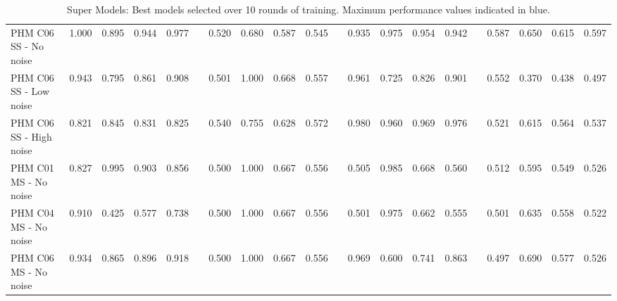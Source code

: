 \documentclass[a4paper, 12pt]{article}
\begin{document}
\begin{appendices}
\begin{landscape}
\begin{table}
\begin{tabular}{@{}l rrrr c rrrr c rrrr c rrrr@{}}
			PHM C06 SS - No noise &\textcolor{dblue}{1.000} &\textcolor{dblue}{0.895} &\textcolor{dblue}{0.944} & \textcolor{dblue}{0.977} & & 0.520 &0.680 &0.587 &0.545 & &0.935 &0.975 &0.954 &0.942 & &0.587 &0.650 &0.615&0.597\\
			PHM C06 SS - Low noise &\textcolor{dblue}{0.943} &0.795 &\textcolor{dblue}{0.861} & \textcolor{dblue}{0.908} & & 0.501 &\textcolor{dblue}{1.000} &0.668 &0.557 & &0.961 &0.725 &0.826 &0.901 & &0.552 &0.370 &0.438&0.497\\
			PHM C06 SS - High noise &0.821 &0.845 &0.831 & 0.825 & & 0.540 &0.755 &0.628 &0.572 & &\textcolor{dblue}{0.980} &\textcolor{dblue}{0.960}&\textcolor{dblue}{0.969} &\textcolor{dblue}{0.976} & &0.521 &0.615 &0.564&0.537\\\midrule
			
			PHM C01 MS - No noise &\textcolor{dblue}{0.827} &0.995 &\textcolor{dblue}{0.903} & \textcolor{dblue}{0.856} & & 0.500 &\textcolor{dblue}{1.000} &0.667 &0.556 & &0.505 &0.985 &0.668 &0.560 & &0.512 &0.595 &0.549&0.526\\
			PHM C04 MS - No noise &\textcolor{dblue}{0.910}&0.425 &0.577 & \textcolor{dblue}{0.738} & & 0.500 &\textcolor{dblue}{1.000} &\textcolor{dblue}{0.667} &0.556 & &0.501 &0.975 &0.662 &0.555 & &0.501 &0.635 &0.558&0.522\\
			PHM C06 MS - No noise &\textcolor{dblue}{0.934} &0.865 &\textcolor{dblue}{0.896} & \textcolor{dblue}{0.918} & & 0.500 &\textcolor{dblue}{1.000} &0.667 &0.556 & &0.969 &0.600 &0.741 &0.863 & &0.497 &0.690 &0.577&0.526\\			
			\bottomrule
		\end{tabular}
		\caption{Super Models: Best models selected over 10 rounds of training. Maximum performance values indicated in   \textcolor{dblue}{blue}.}
		\label{tbl:SuperModelsDetailedMetrics}
	\end{table}
\end{landscape}
\restoregeometry 
{}

%	


\end{appendices}
\end{document}
